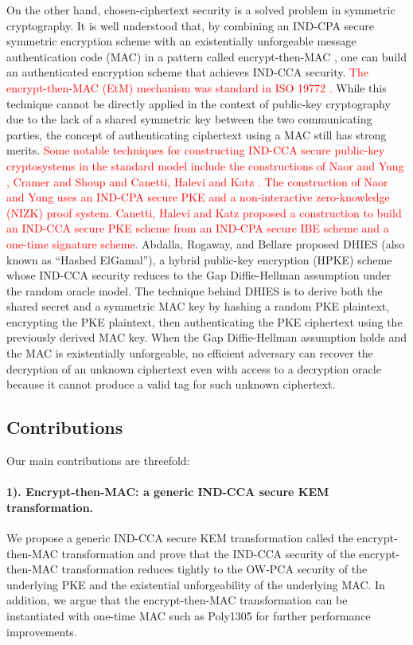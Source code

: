 \documentclass[journal=tches,submission]{iacrtrans}
\begin{document}
On the other hand, chosen-ciphertext security is a solved problem in symmetric cryptography. It is well understood that, by combining an IND-CPA secure symmetric encryption scheme with an existentially unforgeable message authentication code (MAC) in a pattern called encrypt-then-MAC \cite{DBLP:conf/crypto/Krawczyk01}, one can build an authenticated encryption scheme \cite{DBLP:conf/asiacrypt/BellareN00} that achieves IND-CCA security. \textcolor{red}{The encrypt-then-MAC (EtM) mechanism was standard in ISO 19772 \cite{international2009iso-encrypt-then-mac}.} While this technique cannot be directly applied in the context of public-key cryptography due to the lack of a shared symmetric key between the two communicating parties, the concept of authenticating ciphertext using a MAC still has strong merits. \textcolor{red}{Some notable techniques for constructing IND-CCA secure public-key cryptosystems in the standard model include the constructions of Naor and Yung \cite{naor1990public}, Cramer and Shoup \cite{cramer1998practical} and Canetti, Halevi and Katz \cite{CCA-IBE-EUROCRYPT2004}. The construction of Naor and Yung uses an IND-CPA secure PKE and a non-interactive zero-knowledge (NIZK) proof system. Canetti, Halevi and Katz \cite{CCA-IBE-EUROCRYPT2004} proposed a construction to build an IND-CCA secure PKE scheme from an IND-CPA secure IBE scheme and a one-time signature scheme.} Abdalla, Rogaway, and Bellare proposed DHIES (also known as ``Hashed ElGamal'')\cite{DBLP:journals/iacr/AbdallaBR99}\cite{DBLP:conf/ctrsa/AbdallaBR01}, a hybrid public-key encryption (HPKE) scheme whose IND-CCA security reduces to the Gap Diffie-Hellman assumption \cite{DBLP:conf/pkc/OkamotoP01} under the random oracle model. The technique behind DHIES is to derive both the shared secret and a symmetric MAC key by hashing a random PKE plaintext, encrypting the PKE plaintext, then authenticating the PKE ciphertext using the previously derived MAC key. When the Gap Diffie-Hellman assumption holds and the MAC is existentially unforgeable, no efficient adversary can recover the decryption of an unknown ciphertext even with access to a decryption oracle because it cannot produce a valid tag for such unknown ciphertext. 

\subsection{Contributions}
Our main contributions are threefold:

\paragraph{1). Encrypt-then-MAC: a generic IND-CCA secure KEM transformation.} We propose a generic IND-CCA secure KEM transformation called the encrypt-then-MAC transformation and prove that the IND-CCA security of the encrypt-then-MAC transformation reduces tightly to the OW-PCA security of the underlying PKE and the existential unforgeability of the underlying MAC. In addition, we argue that the encrypt-then-MAC transformation can be instantiated with one-time MAC such as Poly1305 for further performance improvements.
\end{document}

